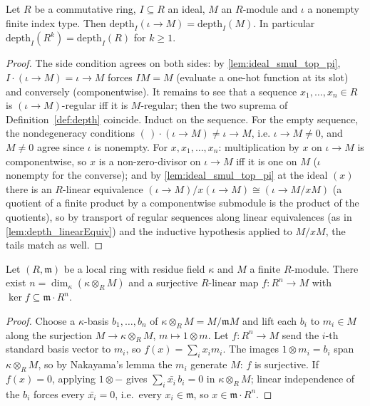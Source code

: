 \begin{lemma}
  \label{lem:depth_pi_const}
  \leanok
  Let \(R\) be a commutative ring, \(I \subseteq R\) an ideal, \(M\) an \(R\)-module and
  \(\iota\) a nonempty finite index type. Then
  \(\mathrm{depth}_I(\iota \to M) = \mathrm{depth}_I(M)\). In particular
  \(\mathrm{depth}_I(R^k) = \mathrm{depth}_I(R)\) for \(k \geq 1\).
\end{lemma}
\begin{proof}
  \leanok
  The side condition agrees on both sides: by \ref{lem:ideal_smul_top_pi},
  \(I \cdot (\iota \to M) = \iota \to M\) forces \(IM = M\) (evaluate a one-hot function
  at its slot) and conversely (componentwise). It remains to see that a sequence
  \(x_1, \dots, x_n \in R\) is \((\iota \to M)\)-regular iff it is \(M\)-regular; then
  the two suprema of Definition~\ref{def:depth} coincide. Induct on the sequence. For
  the empty sequence, the nondegeneracy conditions \((\,)\cdot(\iota \to M) \neq
  \iota \to M\), i.e. \(\iota \to M \neq 0\), and \(M \neq 0\) agree since \(\iota\) is
  nonempty. For \(x, x_1, \dots, x_n\): multiplication by \(x\) on \(\iota \to M\) is
  componentwise, so \(x\) is a non-zero-divisor on \(\iota \to M\) iff it is one on
  \(M\) (\(\iota\) nonempty for the converse); and by \ref{lem:ideal_smul_top_pi} at the
  ideal \((x)\) there is an \(R\)-linear equivalence
  \((\iota \to M)/x(\iota \to M) \cong (\iota \to M/xM)\) (a quotient of a finite
  product by a componentwise submodule is the product of the quotients), so by
  transport of regular sequences along linear equivalences (as in
  \ref{lem:depth_linearEquiv}) and the inductive hypothesis applied to \(M/xM\), the
  tails match as well.
\end{proof}

\begin{lemma}
  \label{lem:minimal_surjection}
  \leanok
  Let \((R, \mathfrak m)\) be a local ring with residue field \(\kappa\) and \(M\) a
  finite \(R\)-module. There exist \(n = \dim_\kappa(\kappa \otimes_R M)\) and a
  surjective \(R\)-linear map \(f : R^n \to M\) with
  \(\ker f \subseteq \mathfrak m \cdot R^n\).
\end{lemma}
\begin{proof}
  \leanok
  Choose a \(\kappa\)-basis \(b_1, \dots, b_n\) of \(\kappa \otimes_R M = M/\mathfrak m M\)
  and lift each \(b_i\) to \(m_i \in M\) along the surjection
  \(M \to \kappa \otimes_R M\), \(m \mapsto 1 \otimes m\). Let \(f : R^n \to M\) send
  the \(i\)-th standard basis vector to \(m_i\), so
  \(f(x) = \sum_i x_i m_i\). The images \(1 \otimes m_i = b_i\) span
  \(\kappa \otimes_R M\), so by Nakayama's lemma the \(m_i\) generate \(M\): \(f\) is
  surjective. If \(f(x) = 0\), applying \(1 \otimes -\) gives
  \(\sum_i \bar{x_i}\, b_i = 0\) in \(\kappa \otimes_R M\); linear independence of the
  \(b_i\) forces every \(\bar{x_i} = 0\), i.e.\ every \(x_i \in \mathfrak m\), so
  \(x \in \mathfrak m \cdot R^n\).
\end{proof}

